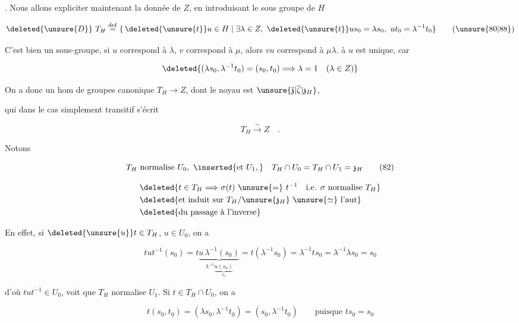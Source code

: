 . Nous allons expliciter maintenant la donnée de $Z$, en introduisant le sous groupe de $H$

\[
\deleted{\unsure{D}}\ T_H\overset{\mathrm{def}}{=}\{\,\deleted{\unsure{t}}u\in H\mid\exists\lambda\in Z,\ \deleted{\unsure{t}}us_0=\lambda s_0,\ ut_0=\lambda^{-1}t_0\}
\tag*{(\unsure{80|88})}
\]

C'est bien un sous-groupe,  si $u$ correspond à $\lambda$, $v$ correspond à $\mu$, alors $vu$ correspond à $\mu\lambda$.  à $u$ est unique, car    

\[
\deleted{(\lambda s_0,\lambda^{-1}t_0)=(s_0,t_0)\Longrightarrow\lambda=1\quad(\lambda\in Z)}
\]

 On a donc un hom de groupes canonique $T_H\longrightarrow Z$, dont le noyau est $\unsure{\overline{\mathfrak z}|\overline\zeta|\mathfrak z_H}$,



qui dans le cas simplement transitif s'écrit

\[
T_H\xrightarrow{\sim}Z\quad .
\tag*{$(81')$}
\]

Notons

\[
T_H\text{ normalise }U_0,\ \inserted{\text{et }U_1,}\quad T_H\cap U_0=T_H\cap U_1=\mathfrak z_H
\tag*{(82)}
\]

\[
\begin{aligned}
&\deleted{t\in T_H\Longrightarrow\sigma(t)\ \unsure{=}\ t^{-1}\quad\text{i.e. }\sigma\text{ normalise }T_H}\\
&\deleted{\text{et induit sur }T_H/\unsure{\mathfrak z_H}\ \unsure{\simeq}\ \text{l'aut}}\\
&\deleted{\text{du passage à l'inverse}}
\end{aligned}
\]

En effet, si $\deleted{\unsure{u}}t\in T_H$, $u\in U_0$, on a

\[
tut^{-1}(s_0)=t\underbrace{u\,\lambda^{-1}(s_0)}_{\lambda^{-1}\underbrace{u(s_0)}_{s_0}}=t(\lambda^{-1}s_0)=\lambda^{-1}ts_0=\lambda^{-1}\lambda s_0=s_0
\]

d'où $tut^{-1}\in U_0$,   voit  que $T_H$ normalise $U_1$. Si $t\in T_H\cap U_0$, on a

\[
t(s_0,t_0)=(\lambda s_0,\lambda^{-1}t_0)=(s_0,\lambda^{-1}t_0)\qquad\text{puisque }ts_0=s_0
\]

